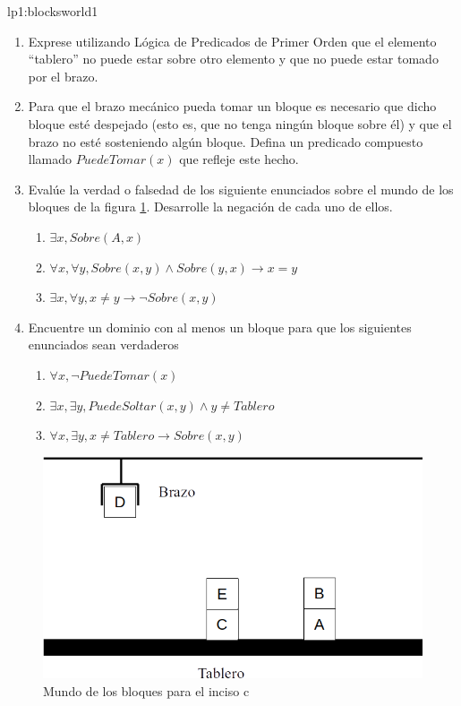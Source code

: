 \begin{defproblem}{lp1:blocksworld1}
\begin{onlyproblem}
	\begin{enumerate}
		\item Exprese utilizando Lógica de Predicados de Primer Orden que el elemento ``tablero'' no puede estar sobre otro elemento y que no puede estar tomado por el brazo.
		\item Para que el brazo mecánico pueda tomar un bloque es necesario que dicho bloque esté despejado (esto es, que no tenga ningún bloque sobre él) y que el brazo no esté sosteniendo algún bloque. Defina un predicado compuesto llamado $ PuedeTomar(x) $ que refleje este hecho.
		\item Evalúe la verdad o falsedad de los siguiente enunciados sobre el mundo de los bloques de la figura \ref{fig:blocksworld1}. Desarrolle la negación de cada uno de ellos.
		\begin{enumerate}
			\item $ \exists x, Sobre(A,x)  $
			\item $ \forall x, \forall y, Sobre(x,y) \land Sobre(y, x) \rightarrow x=y $
			\item $ \exists x, \forall y, x \neq y \rightarrow \neg Sobre(x, y) $
		\end{enumerate}
		\item Encuentre un dominio con al menos un bloque para que los siguientes enunciados sean verdaderos
		\begin{enumerate}
			\item $ \forall x, \neg PuedeTomar(x) $
			\item $ \exists x, \exists y, PuedeSoltar(x,y) \land y \neq Tablero $
			\item $ \forall x, \exists y,  x \neq Tablero \rightarrow Sobre(x, y) $
		\end{enumerate}
	\end{enumerate}

	\begin{figure}
		\centering
		\includegraphics[width=0.7\linewidth]{Blocksworld1}
		\caption{Mundo de los bloques para el inciso c}
		\label{fig:blocksworld1}
	\end{figure}
	
 \end{onlyproblem}%
 \begin{onlysolution}%
 	
 	\end{onlysolution}
 \end{defproblem}
 

